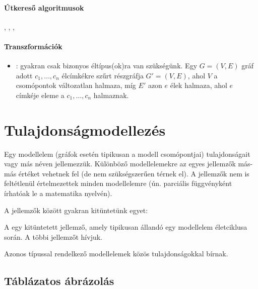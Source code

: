 \paragraph{Útkereső algoritmusok}

, , , 


\paragraph{Transzformációk}

\begin{itemize}
\item {}: gyakran csak bizonyos éltípus(ok)ra van szükségünk. Egy $G = (V, E)$ gráf adott $c_1, \dots, c_n$ élcímkékre szűrt részgráfja $G' = (V, E)$, ahol $V$ a csomópontok változatlan halmaza, míg $E'$ azon $e$ élek halmaza, ahol $e$ címkéje eleme a $c_1, \dots, c_n$ halmaznak.
\end{itemize}



\section{Tulajdonságmodellezés}

Egy modellelem (gráfok esetén tipikusan a modell csomópontjai) tulajdonságait  vagy más néven  jellemezzük. Különböző modellelemekre az egyes jellemzők más-más értéket vehetnek fel (de nem szükségszerűen térnek el). A jellemzők nem is feltétlenül értelmezettek minden modellelemre (ún. parciális függvényként írhatóak le a matematika nyelvén).

A jellemzők között gyakran kitüntetünk egyet:

\begin{definicio}
A  egy kitüntetett jellemző, amely tipikusan állandó egy modellelem életciklusa során. A többi jellemzőt  hívjuk.
\end{definicio}

Azonos típussal rendelkező modellelemek közös tulajdonságokkal bírnak.

\subsection{Táblázatos ábrázolás}

